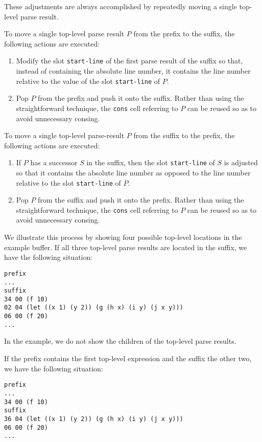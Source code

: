 These adjustments are always accomplished by repeatedly moving a
single top-level parse result.

To move a single top-level parse result $P$ from the prefix to the
suffix, the following actions are executed:

\begin{enumerate}
\item Modify the slot \texttt{start-line} of the first parse result of
  the suffix so that, instead of containing the absolute line number,
  it contains the line number relative to the value of the slot
  \texttt{start-line} of $P$.
\item Pop $P$ from the prefix and push it onto the suffix.  Rather
  than using the straightforward technique, the \texttt{cons} cell
  referring to $P$ can be reused so as to avoid unnecessary consing.
\end{enumerate}

To move a single top-level parse-result $P$ from the suffix to the
prefix, the following actions are executed:

\begin{enumerate}
\item If $P$ has a successor $S$ in the suffix, then the slot
  \texttt{start-line} of $S$ is adjusted so that it contains the
  absolute line number as opposed to the line number relative to the
  slot \texttt{start-line} of $P$.
\item Pop $P$ from the suffix and push it onto the prefix.  Rather
  than using the straightforward technique, the \texttt{cons} cell
  referring to $P$ can be reused so as to avoid unnecessary consing.
\end{enumerate}

We illustrate this process by showing four possible top-level
locations in the example buffer.  If all three top-level parse results
are located in the suffix, we have the following situation:

\begin{verbatim}
prefix
...
suffix
34 00 (f 10)
02 04 (let ((x 1) (y 2)) (g (h x) (i y) (j x y)))
06 00 (f 20)
...
\end{verbatim}

In the example, we do not show the children of the top-level parse
results.

If the prefix contains the first top-level expression and the suffix
the other two, we have the following situation:

\begin{verbatim}
prefix
...
34 00 (f 10)
suffix
36 04 (let ((x 1) (y 2)) (g (h x) (i y) (j x y)))
06 00 (f 20)
...
\end{verbatim}

